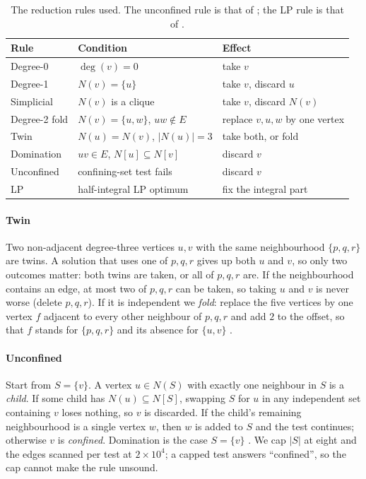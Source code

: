 \documentclass[review,authoryear,11pt]{elsarticle}
\theoremstyle{definition}
\begin{document}
\begin{table}[htbp]
\centering
\caption{The reduction rules used. The unconfined rule is that of
\citet{xiao2017}; the LP rule is that of \citet{nemhauser1975}.}
\label{tab:rules}
\small
\begin{tabular}{lll}
\toprule
Rule & Condition & Effect \\
\midrule
Degree-0 & $\deg(v)=0$ & take $v$ \\
Degree-1 & $N(v)=\{u\}$ & take $v$, discard $u$ \\
Simplicial & $N(v)$ is a clique & take $v$, discard $N(v)$ \\
Degree-2 fold & $N(v)=\{u,w\}$, $uw \notin E$ & replace $v,u,w$ by one vertex \\
Twin & $N(u)=N(v)$, $|N(u)|=3$ & take both, or fold \\
Domination & $uv \in E$, $N[u] \subseteq N[v]$ & discard $v$ \\
Unconfined & confining-set test fails & discard $v$ \\
LP & half-integral LP optimum & fix the integral part \\
\bottomrule
\end{tabular}
\end{table}

\paragraph{Twin} Two non-adjacent degree-three vertices $u,v$ with the same
neighbourhood $\{p,q,r\}$ are twins. A solution that uses one of $p,q,r$ gives up
both $u$ and $v$, so only two outcomes matter: both twins are taken, or all of
$p,q,r$ are. If the neighbourhood contains an edge, at most two of $p,q,r$ can be
taken, so taking $u$ and $v$ is never worse (delete $p,q,r$). If it is independent
we \emph{fold}: replace the five vertices by one vertex $f$ adjacent to every other
neighbour of $p,q,r$ and add $2$ to the offset, so that $f$ stands for $\{p,q,r\}$
and its absence for $\{u,v\}$ \citep{akiba2016}.

\paragraph{Unconfined} Start from $S=\{v\}$. A vertex $u\in N(S)$ with exactly one
neighbour in $S$ is a \emph{child}. If some child has $N(u)\subseteq N[S]$, swapping
$S$ for $u$ in any independent set containing $v$ loses nothing, so $v$ is
discarded. If the child's remaining neighbourhood is a single vertex $w$, then $w$
is added to $S$ and the test continues; otherwise $v$ is \emph{confined}. Domination
is the case $S=\{v\}$ \citep{xiao2013,xiao2017}. We cap $|S|$ at eight and the edges
scanned per test at $2\times10^4$; a capped test answers ``confined'', so the cap
cannot make the rule unsound.
\end{document}
